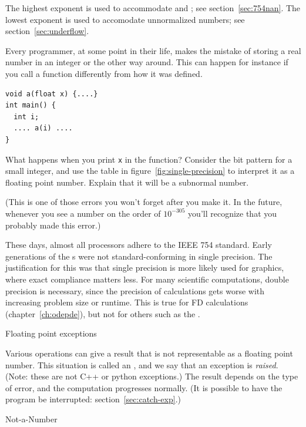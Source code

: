 The highest exponent is used to accommodate  and ;
see section~\ref{sec:754nan}.
The lowest exponent is used to accomodate unnormalized numbers;
see section~\ref{sec:underflow}.

\begin{exercise}
  Every programmer, at some point in their life, makes the mistake of
  storing a real number in an integer or the other way around. This
  can happen for instance if you call a function differently from how
  it was defined.
\begin{lstlisting}
void a(float x) {....}
int main() {
  int i;
  .... a(i) ....
}
\end{lstlisting}
What happens when you print \lstinline{x} in the function? Consider the bit
pattern for a small integer, and use the table in
figure~\ref{fig:single-precision} to interpret it as a floating point
number. Explain that it will be a subnormal number.

(This
  is one of those errors you won't forget after you make it. In the
  future, whenever you see a number on the order of $10^{-305}$ you'll
  recognize that you probably made this error.)
\end{exercise}

These days, almost all processors adhere to the IEEE 754 standard.
Early generations of the 
s were not standard-conforming in single precision.
The justification
for this was that single precision is more likely used for graphics,
where exact compliance matters less. For many scientific computations,
double precision is necessary, since the precision of calculations
gets worse with increasing problem size or runtime.
This is true for \ac{FD} calculations (chapter~\ref{ch:odepde}),
but not for others such as the .


 {Floating point exceptions}

Various operations can give a result that is not representable as a
floating point number. This situation is called an ,
and we say that an exception is \emph{raised}.
(Note: these are not C++ or python exceptions.)
The result depends on the type of error, and the computation
progresses normally. (It is possible to have the program
be interrupted: section~\ref{sec:catch-exp}.)

 {Not-a-Number}
\label{sec:754nan}

